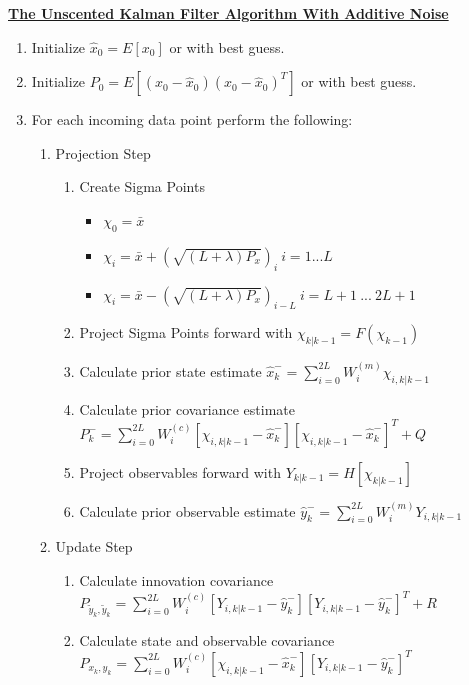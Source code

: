\documentclass{article}
\begin{document}
\begin{tcolorbox}
\doublespacing
\textbf{\underline{The Unscented Kalman Filter Algorithm With Additive Noise}} 
\begin{enumerate}
    \item Initialize $\hat{x}_0 = E[x_0]$ or with best guess.
    \item Initialize $P_0 = E[(x_0 - \hat{x}_0)(x_0 - \hat{x}_0)^T]$ or with best guess.
    \item For each incoming data point perform the following:
    \begin{enumerate}
        \item Projection Step
        \begin{enumerate}
            \item Create Sigma Points 
            \begin{itemize}
                \item  $\chi_0 = \bar{x}$
                \item $ \chi_i = \bar{x} + (\sqrt{(L + \lambda)P_x})_i \ i = 1 ... L $
                \item $ \chi_i = \bar{x} - (\sqrt{(L + \lambda)P_x})_{i - L} \ i = L + 1 \  ...  \ 2L + 1 $
            \end{itemize}
            \item Project Sigma Points forward with $\chi_{k|k-1} = F(\chi_{k-1})$
            \item Calculate prior state estimate $ \hat{x}_k^- = \sum_{i = 0}^{2L} W_i^{(m)} \chi_{i, k|k-1}$
            \item Calculate prior covariance estimate $ P_k^- = \sum_{i = 0}^{2L} W_i^{(c)} [\chi_{i, k|k-1} - \hat{x}_k^-][\chi_{i, k|k-1} - \hat{x}_k^-]^T + Q$
            \item Project observables forward with $Y_{k|k-1} = H[\chi_{k|k-1}]$
            \item Calculate prior observable estimate $\hat{y}_k^- = \sum_{i=0}^{2L} W_i^{(m)} Y_{i,k|k-1}$
        \end{enumerate}
        \item Update Step
        \begin{enumerate}
            \item Calculate innovation covariance $P_{\tilde{y}_k, \tilde{y}_k} = \sum_{i=0}^{2L} W_i^{(c)} [Y_{i,k|k-1} - \hat{y}_k^-][Y_{i,k|k-1} - \hat{y}_k^-]^T + R$
            \item Calculate state and observable covariance $ P_{{x}_k,{y}_k} = \sum_{i=0}^{2L} W_i^{(c)} [\chi_{i,k|k-1} - \hat{x}_k^-][Y_{i,k|k-1} - \hat{y}_k^-]^T$

\end{enumerate}
\end{enumerate}
\end{enumerate}
\end{tcolorbox}
\end{document}
